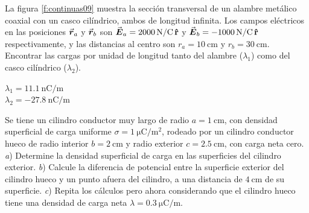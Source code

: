 %
\begin{Exercise}\label{p:continuas09}
  La figura \ref{f:continuas09} muestra la sección transversal de un alambre metálico coaxial con un casco cilíndrico, ambos de longitud infinita. Los campos eléctricos en las posiciones $\va*{r}_a$ y $\va*{r}_b$ son $\va*{E}_a = \SI{2000}{\newton/\coulomb}\,\vu{r}$ y $\va*{E}_b = \SI{-1000}{\newton/\coulomb}\,\vu{r}$ respectivamente, y las distancias al centro son $r_a = \SI{10}{\centi\metre}$ y $r_b = \SI{30}{\centi\metre}$. Encontrar las cargas por unidad de longitud tanto del alambre ($\lambda_1$) como del casco cilíndrico ($\lambda_2$).
\end{Exercise}
\begin{Answer}
  \begin{minipage}[t]{.4\textwidth}
    $\lambda_1 = \SI{11.1}{\nano\coulomb/\metre}$\\ $\lambda_2 = \SI{-27.8}{\nano\coulomb/\metre}$
  \end{minipage}
\end{Answer}
%
\begin{center}
\end{center}
%
\begin{Exercise}
  Se tiene un cilindro conductor muy largo de radio $a = \SI{1}{\centi\metre}$, con densidad superficial de carga uniforme $\sigma = \SI{1}{\micro\coulomb/\metre\squared}$, rodeado por un cilindro conductor hueco de radio interior $b = \SI{2}{\centi\metre}$ y radio exterior $c = \SI{2.5}{\centi\metre}$, con carga neta cero. \textit{a}) Determine la densidad superficial de carga en las superficies del cilindro exterior. \textit{b}) Calcule la diferencia de potencial entre la superficie exterior del cilindro hueco y un punto afuera del cilindro, a una distancia de $\SI{4}{\centi\metre}$ de su superficie. \textit{c}) Repita los cálculos pero ahora considerando que el cilindro hueco tiene una densidad de carga neta $\lambda = \SI{0.3}{\micro\coulomb/\metre}$.
\end{Exercise}
